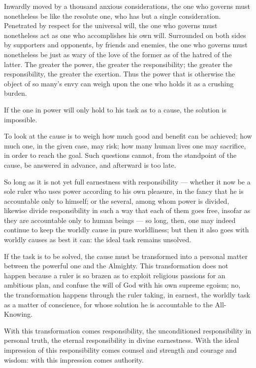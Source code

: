 \documentclass[12pt,a4paper]{book}
\begin{document}
Inwardly moved by a thousand anxious considerations, the one who governs must nonetheless be like the resolute one, who has but a single consideration. Penetrated by respect for the universal will, the one who governs must nonetheless act as one who accomplishes his own will. Surrounded on both sides by supporters and opponents, by friends and enemies, the one who governs must nonetheless be just as wary of the love of the former as of the hatred of the latter. The greater the power, the greater the responsibility; the greater the responsibility, the greater the exertion. Thus the power that is otherwise the object of so many's envy can weigh upon the one who holds it as a crushing burden.

If the one in power will only hold to his task as to a cause, the solution is impossible.

To look at the cause is to weigh how much good and benefit can be achieved; how much one, in the given case, may risk; how many human lives one may sacrifice, in order to reach the goal. Such questions cannot, from the standpoint of the cause, be answered in advance, and afterward is too late.

So long as it is not yet full earnestness with responsibility --- whether it now be a sole ruler who uses power according to his own pleasure, in the fancy that he is accountable only to himself; or the several, among whom power is divided, likewise divide responsibility in such a way that each of them goes free, insofar as they are accountable only to human beings --- so long, then, one may indeed continue to keep the worldly cause in pure worldliness; but then it also goes with worldly causes as best it can: the ideal task remains unsolved.

If the task is to be solved, the cause must be transformed into a personal matter between the powerful one and the Almighty.
This transformation does not happen because a ruler is so brazen as to exploit religious passions for an ambitious plan, and confuse the will of God with his own supreme egoism; no, the transformation happens through the ruler taking, in earnest, the worldly task as a matter of conscience, for whose solution he is accountable to the All-Knowing.

With this transformation comes responsibility, the unconditioned responsibility in personal truth, the eternal responsibility in divine earnestness. With the ideal impression of this responsibility comes counsel and strength and courage and wisdom: with this impression comes authority.
\end{document}
